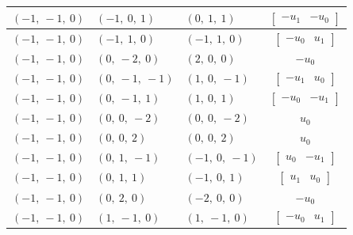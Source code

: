 \documentclass[11pt]{article}
\theoremstyle{definition}
\begin{document}
\begin{longtable}{|l|l|l|c|}
    \hline
    $\left( -1, \  -1, \  0\right)$ & $\left( -1, \  0, \  1\right)$ & $\left( 0, \  1, \  1\right)$ & $\left[\begin{matrix}- u_{1} & - u_{0}\end{matrix}\right]$ \\
    \hline
    $\left( -1, \  -1, \  0\right)$ & $\left( -1, \  1, \  0\right)$ & $\left( -1, \  1, \  0\right)$ & $\left[\begin{matrix}- u_{0} & u_{1}\end{matrix}\right]$ \\
    \hline
    $\left( -1, \  -1, \  0\right)$ & $\left( 0, \  -2, \  0\right)$ & $\left( 2, \  0, \  0\right)$ & $- u_{0}$ \\
    \hline
    $\left( -1, \  -1, \  0\right)$ & $\left( 0, \  -1, \  -1\right)$ & $\left( 1, \  0, \  -1\right)$ & $\left[\begin{matrix}- u_{1} & u_{0}\end{matrix}\right]$ \\
    \hline
    $\left( -1, \  -1, \  0\right)$ & $\left( 0, \  -1, \  1\right)$ & $\left( 1, \  0, \  1\right)$ & $\left[\begin{matrix}- u_{0} & - u_{1}\end{matrix}\right]$ \\
    \hline
    $\left( -1, \  -1, \  0\right)$ & $\left( 0, \  0, \  -2\right)$ & $\left( 0, \  0, \  -2\right)$ & $u_{0}$ \\
    \hline
    $\left( -1, \  -1, \  0\right)$ & $\left( 0, \  0, \  2\right)$ & $\left( 0, \  0, \  2\right)$ & $u_{0}$ \\
    \hline
    $\left( -1, \  -1, \  0\right)$ & $\left( 0, \  1, \  -1\right)$ & $\left( -1, \  0, \  -1\right)$ & $\left[\begin{matrix}u_{0} & - u_{1}\end{matrix}\right]$ \\
    \hline
    $\left( -1, \  -1, \  0\right)$ & $\left( 0, \  1, \  1\right)$ & $\left( -1, \  0, \  1\right)$ & $\left[\begin{matrix}u_{1} & u_{0}\end{matrix}\right]$ \\
    \hline
    $\left( -1, \  -1, \  0\right)$ & $\left( 0, \  2, \  0\right)$ & $\left( -2, \  0, \  0\right)$ & $- u_{0}$ \\
    \hline
    $\left( -1, \  -1, \  0\right)$ & $\left( 1, \  -1, \  0\right)$ & $\left( 1, \  -1, \  0\right)$ & $\left[\begin{matrix}- u_{0} & u_{1}\end{matrix}\right]$ \\

\end{longtable}
\end{document}
